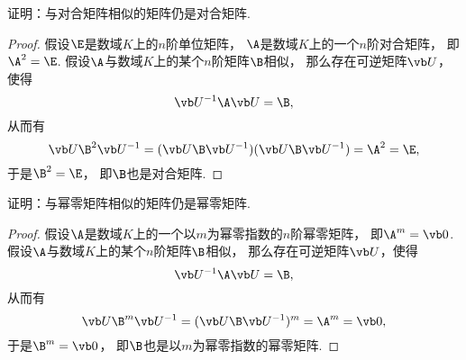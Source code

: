 \begin{example}\label{example:对合矩阵.对合矩阵的相似类}
证明：与对合矩阵相似的矩阵仍是对合矩阵.
\begin{proof}
假设\(\E\)是数域\(K\)上的\(n\)阶单位矩阵，
\(\A\)是数域\(K\)上的一个\(n\)阶对合矩阵，
即\(\A^2=\E\).
假设\(\A\)与数域\(K\)上的某个\(n\)阶矩阵\(\B\)相似，
那么存在可逆矩阵\(\P\)，使得\[
	\P^{-1}\A\P = \B,
\]
从而有\[
	\P\B^2\P^{-1}
	= (\P\B\P^{-1})(\P\B\P^{-1})
	= \A^2
	= \E,
\]
于是\(\B^2=\E\)，
即\(\B\)也是对合矩阵.
\end{proof}
\end{example}
\begin{example}\label{example:幂零矩阵.幂零矩阵的相似类}
证明：与幂零矩阵相似的矩阵仍是幂零矩阵.
\begin{proof}
假设\(\A\)是数域\(K\)上的一个以\(m\)为幂零指数的\(n\)阶幂零矩阵，
即\(\A^m=\vb0\).
假设\(\A\)与数域\(K\)上的某个\(n\)阶矩阵\(\B\)相似，
那么存在可逆矩阵\(\P\)，使得\[
	\P^{-1}\A\P = \B,
\]
从而有\[
	\P\B^m\P^{-1}
	= (\P\B\P^{-1})^m
	= \A^m
	= \vb0,
\]
于是\(\B^m=\vb0\)，
即\(\B\)也是以\(m\)为幂零指数的幂零矩阵.
\end{proof}
\end{example}
